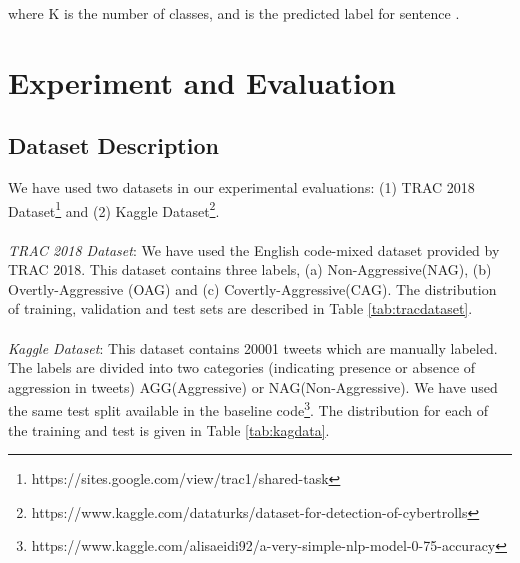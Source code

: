 \documentclass[sigconf]{acmart}
\begin{document}
 
where K is the number of classes, and  is the predicted label for sentence .
\section{Experiment and Evaluation}\label{exp}
\subsection{Dataset Description}
We have used two datasets in our experimental evaluations: (1) TRAC 2018 Dataset\footnote{https://sites.google.com/view/trac1/shared-task} and (2) Kaggle Dataset\footnote{https://www.kaggle.com/dataturks/dataset-for-detection-of-cybertrolls}.\\
\\
\textit{TRAC 2018 Dataset}: We have used the English code-mixed dataset provided by TRAC 2018. This dataset contains three labels, (a) Non-Aggressive(NAG), (b) Overtly-Aggressive (OAG) and (c) Covertly-Aggressive(CAG). The distribution of training, validation and test sets are described in Table \ref{tab:tracdataset}.\\
\\
\textit{Kaggle Dataset}: This dataset contains 20001 tweets which are manually labeled. The labels are divided into two categories (indicating presence or absence of aggression in tweets) AGG(Aggressive) or NAG(Non-Aggressive). We have used the same test split available in the baseline code\footnote{https://www.kaggle.com/alisaeidi92/a-very-simple-nlp-model-0-75-accuracy}. The distribution for each of the training and test is given in Table \ref{tab:kagdata}.
\newcolumntype{b}{X}
\end{document}
